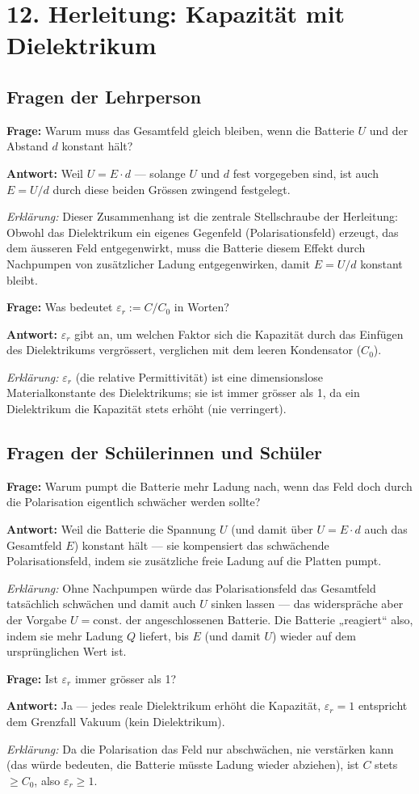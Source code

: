 \documentclass[11pt,a4paper]{article}
\newcommand{\Frage}[1]{\textbf{Frage:} #1\par}
\newcommand{\Antwort}[1]{\textbf{Antwort:} #1\par}
\newcommand{\Erklaerung}[1]{\textit{Erklärung:} #1}
\newcommand{\FrageBlock}[3]{\Frage{#1}\Antwort{#2}\Erklaerung{#3}\vspace{0.6em}}
\begin{document}
\section*{12. Herleitung: Kapazität mit Dielektrikum}

\subsection*{Fragen der Lehrperson}

\FrageBlock{Warum muss das Gesamtfeld gleich bleiben, wenn die Batterie $U$ und der Abstand $d$ konstant hält?}
{Weil $U=E\cdot d$ --- solange $U$ und $d$ fest vorgegeben sind, ist auch $E=U/d$ durch diese beiden Grössen zwingend festgelegt.}
{Dieser Zusammenhang ist die zentrale Stellschraube der Herleitung: Obwohl das Dielektrikum ein eigenes Gegenfeld (Polarisationsfeld) erzeugt, das dem äusseren Feld entgegenwirkt, muss die Batterie diesem Effekt durch Nachpumpen von zusätzlicher Ladung entgegenwirken, damit $E=U/d$ konstant bleibt.}

\FrageBlock{Was bedeutet $\varepsilon_r:=C/C_0$ in Worten?}
{$\varepsilon_r$ gibt an, um welchen Faktor sich die Kapazität durch das Einfügen des Dielektrikums vergrössert, verglichen mit dem leeren Kondensator ($C_0$).}
{$\varepsilon_r$ (die relative Permittivität) ist eine dimensionslose Materialkonstante des Dielektrikums; sie ist immer grösser als 1, da ein Dielektrikum die Kapazität stets erhöht (nie verringert).}

\subsection*{Fragen der Schülerinnen und Schüler}

\FrageBlock{Warum pumpt die Batterie mehr Ladung nach, wenn das Feld doch durch die Polarisation eigentlich schwächer werden sollte?}
{Weil die Batterie die Spannung $U$ (und damit über $U=E\cdot d$ auch das Gesamtfeld $E$) konstant hält --- sie kompensiert das schwächende Polarisationsfeld, indem sie zusätzliche freie Ladung auf die Platten pumpt.}
{Ohne Nachpumpen würde das Polarisationsfeld das Gesamtfeld tatsächlich schwächen und damit auch $U$ sinken lassen --- das widerspräche aber der Vorgabe $U=\text{const.}$ der angeschlossenen Batterie. Die Batterie „reagiert“ also, indem sie mehr Ladung $Q$ liefert, bis $E$ (und damit $U$) wieder auf dem ursprünglichen Wert ist.}

\FrageBlock{Ist $\varepsilon_r$ immer grösser als 1?}
{Ja --- jedes reale Dielektrikum erhöht die Kapazität, $\varepsilon_r=1$ entspricht dem Grenzfall Vakuum (kein Dielektrikum).}
{Da die Polarisation das Feld nur abschwächen, nie verstärken kann (das würde bedeuten, die Batterie müsste Ladung wieder abziehen), ist $C$ stets $\geq C_0$, also $\varepsilon_r\geq 1$.}
\end{document}
